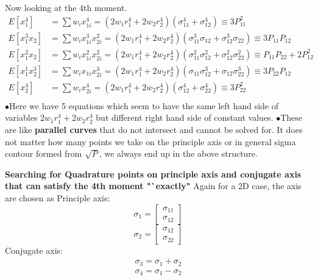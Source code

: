\documentclass[landscape]{slides}
\begin{document}
\begin{slide}
 Now looking at the 4th moment.
 \tiny
 \begin{align*}
  E[x_1^4]&=\sum{w_ix_{1i}^4}=(2w_1r_1^4+2w_2r_2^4)(\sigma_{11}^4+\sigma_{12}^4)\equiv 3P_{11}^2\\ E[x_1^3x_2]&=\sum{w_ix_{1i}^3x_{2i}^2}=(2w_1r_1^4+2w_2r_2^4)(\sigma_{11}^3\sigma_{12}+\sigma_{12}^3\sigma_{22})\equiv3P_{11}P_{12}\\
E[x_1^2x_2]&=\sum{w_ix_{1i}^2x_{2i}^2}=(2w_1r_1^4+2w_2r_2^4)(\sigma_{11}^2\sigma_{12}^2+\sigma_{12}^2\sigma_{22}^2)\equiv P_{11}P_{22}+2P_{12}^2\\
E[x_1^1x_2^3]&=\sum{w_ix_{1i}x_{2i}^3}=(2w_1r_1^4+2w_2r_2^4)(\sigma_{11}\sigma_{12}^3+\sigma_{12}\sigma_{22}^3)\equiv 3P_{22}P_{12}\\
E[x_2^4]&=\sum{w_ix_{2i}^4}=(2w_1r_1^4+2w_2r_2^4)(\sigma_{12}^4+\sigma_{22}^4)\equiv 3P_{22}^2\\ 
 \end{align*}
 \normalsize
$\bullet$Here we have 5 equations which seem to have the same left hand side of variables $2w_1r_1^4+2w_2r_2^4$ but different right hand side of constant values.\newline\newline 
$\bullet$These are like {\bf parallel curves} that do not intersect and cannot be solved for. It does not matter how many points we take on the principle axis or in general sigma contour formed from $\sqrt{P}$, we always end up in the above structure. 
   	\end{slide}
\begin{slide}
{\bf Searching for Quadrature points on principle axis and conjugate axis that can satisfy the 4th moment "`exactly"}\newline
	 Again for a 2D case, the axis are chosen as\newline
	Principle axis:
\[\sigma_1=\left[ {\begin{array}{c}
 \sigma_{11}\\
 \sigma_{12}
 \end{array} } \right]\]
 \[\sigma_2=\left[ {\begin{array}{c}
 \sigma_{12}\\
 \sigma_{22}
 \end{array} } \right]\]
 Conjugate axis:
 \begin{align*}
 \sigma_3=\sigma_1+\sigma_2\\
 \sigma_4=\sigma_1-\sigma_2
 \end{align*}
    	\end{slide}
\end{document}
